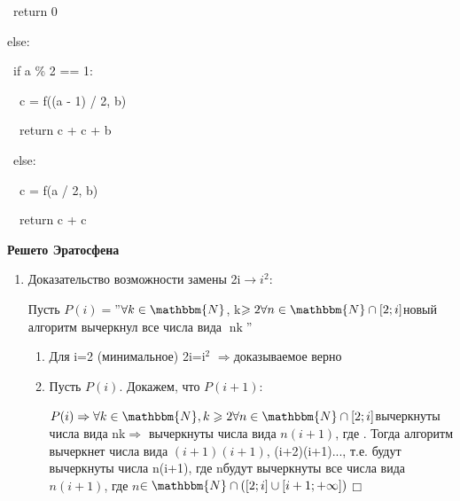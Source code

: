 \documentclass{letter}
\newcommand{\nosymbol}{}
\newcommand{\tmem}[1]{{\em #1\/}}
\newcommand{\tmname}[1]{\textsc{#1}}
\newcommand{\tmop}[1]{\ensuremath{\operatorname{#1}}}
\newcommand{\tmsamp}[1]{\textsf{#1}}
\newcommand{\tmstrong}[1]{\textbf{#1}}
\newcommand{\tmtextbf}[1]{{\bfseries{#1}}}
\newcommand{\tmtexttt}[1]{{\ttfamily{#1}}}
\newenvironment{enumeratenumeric}{\begin{enumerate}[1.] }{\end{enumerate}}
\newenvironment{tmindent}{\begin{tmparmod}{1.5em}{0pt}{0pt} }{\end{tmparmod}}
\newenvironment{tmparmod}[3]{\begin{list}{}{\setlength{\topsep}{0pt}\setlength{\leftmargin}{#1}\setlength{\rightmargin}{#2}\setlength{\parindent}{#3}\setlength{\listparindent}{\parindent}\setlength{\itemindent}{\parindent}\setlength{\parsep}{\parskip}} \item[]}{\end{list}}
\newenvironment{tmparsep}[1]{\begingroup\setlength{\parskip}{#1}}{\endgroup}
\begin{document}
\begin{enumeratenumeric}
\begin{tmindent}
\begin{tmparsep}{0em}
      \ return 0
      
      else:
      
      \ if a \% 2 == 1:
      
      \ \ c = f((a - 1) / 2, b)
      
      \ \ return c + c + b
      
      \ else:
      
      \ \ c = f(a / 2, b)
      
      \ \ return c + c
    \end{tmparsep}
  \end{tmindent}{\hspace*{\fill}}{\medskip}
  
  \item \tmtextbf{Решето Эратосфена}
  \begin{enumerate}
    \item Доказательство возможности замены
    2i$\rightarrow i^2$:
    
    Пусть $P (i) =$''$\forall k \in \mathbbm{N}$, k$\geqslant 2 \forall n
    \in \mathbbm{N} \cap \left[ 2 ; i \right]$новый алгоритм
    вычеркнул все числа вида
    $\tmop{nk}$''\tmtexttt{{\tmstrong{{\tmem{{\tmsamp{}}}}}}}
    \begin{enumeratenumeric}
      \item Для i=2 (минимальное) 2i=i$^2$
      $\Rightarrow$доказываемое верно
      
      \item Пусть $P (i)$. Докажем, что $P (i + 1)$:
      
      $P (i) \Rightarrow \forall k \in \mathbbm{N}, k \geqslant 2 \forall n
      \in \mathbbm{N} \cap \left[ 2 ; i \right] $вычеркнуты
      числа вида nk$\Rightarrow$ вычеркнуты числа
      вида $n (i + 1)$, где \mathup{$n$\tmtexttt{{\tmsamp{{\tmname{$\in
      \mathbbm{N} \cap \left[ 2 ; i \right]$}}}}}}. Тогда
      алгоритм вычеркнет числа вида $(i + 1) (i +
      1)$, (i+2)(i+1)..., т.е. будут вычеркнуты числа
      n(i+1), где n\tmtexttt{{\tmsamp{{\tmname{$\in \mathbbm{N}, n
      \geqslant i + 1 \nosymbol \Rightarrow$}}}}}будут
      вычеркнуты все числа вида $n (i + 1)$, где
      $n${\tmname{$\in \mathbbm{N} \cap \left( \left[ 2 ; i \right] \cup
      \left[ i + 1 ; + \infty \right] \right)$}}$\Box$
      

\end{enumeratenumeric}
\end{enumerate}
\end{enumeratenumeric}
\end{document}
